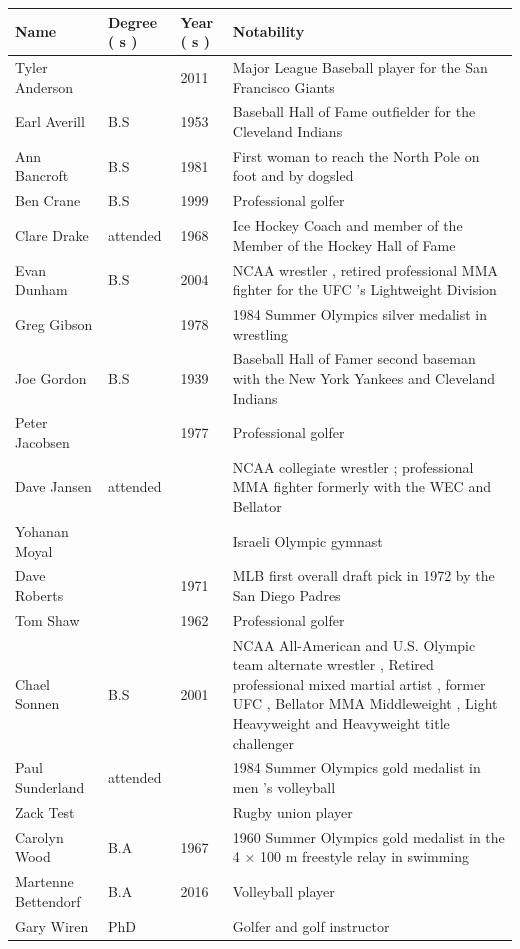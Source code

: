 \documentclass{article}
\begin{document}
\begin{tabular}{llll}
\toprule
Name & Degree ( s ) & Year ( s ) & Notability \\
\midrule
Tyler Anderson &  & 2011 & Major League Baseball player for the San Francisco Giants \\
Earl Averill & B.S & 1953 & Baseball Hall of Fame outfielder for the Cleveland Indians \\
Ann Bancroft & B.S & 1981 & First woman to reach the North Pole on foot and by dogsled \\
Ben Crane & B.S & 1999 & Professional golfer \\
Clare Drake & attended & 1968 & Ice Hockey Coach and member of the Member of the Hockey Hall of Fame \\
Evan Dunham & B.S & 2004 & NCAA wrestler , retired professional MMA fighter for the UFC 's Lightweight Division \\
Greg Gibson &  & 1978 & 1984 Summer Olympics silver medalist in wrestling \\
Joe Gordon & B.S & 1939 & Baseball Hall of Famer second baseman with the New York Yankees and Cleveland Indians \\
Peter Jacobsen &  & 1977 & Professional golfer \\
Dave Jansen & attended &  & NCAA collegiate wrestler ; professional MMA fighter formerly with the WEC and Bellator \\
Yohanan Moyal &  &  & Israeli Olympic gymnast \\
Dave Roberts &  & 1971 & MLB first overall draft pick in 1972 by the San Diego Padres \\
Tom Shaw &  & 1962 & Professional golfer \\
Chael Sonnen & B.S & 2001 & NCAA All-American and U.S. Olympic team alternate wrestler , Retired professional mixed martial artist , former UFC , Bellator MMA Middleweight , Light Heavyweight and Heavyweight title challenger \\
Paul Sunderland & attended &  & 1984 Summer Olympics gold medalist in men 's volleyball \\
Zack Test &  &  & Rugby union player \\
Carolyn Wood & B.A & 1967 & 1960 Summer Olympics gold medalist in the 4 × 100 m freestyle relay in swimming \\
Martenne Bettendorf & B.A & 2016 & Volleyball player \\
Gary Wiren & PhD &  & Golfer and golf instructor \\
\bottomrule
\end{tabular}
\end{document}
